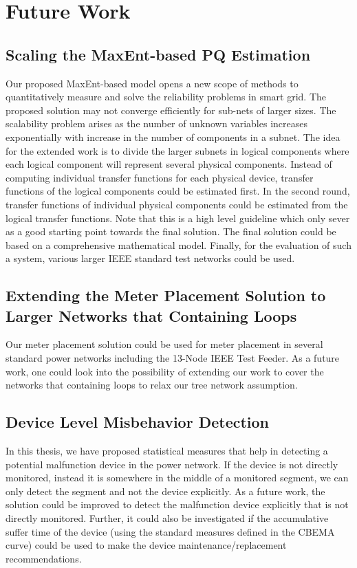 \documentclass[12pt,oneside]{book}
\begin{document}
\section{Future Work}
\subsection{Scaling the MaxEnt-based PQ Estimation}
Our proposed MaxEnt-based model opens a new scope of methods to quantitatively measure and solve the reliability problems in smart grid. The proposed solution may not converge efficiently for sub-nets of larger sizes. The scalability problem arises as the number of unknown variables increases exponentially with increase in the number of components in a subnet. The idea for the extended work is to divide the larger subnets in logical components where each logical component will represent several physical components. Instead of computing individual transfer functions for each physical device, transfer functions of the logical components could be estimated first. In the second round, transfer functions of individual physical components could be estimated from the logical transfer functions. Note that this is a high level guideline which only sever as a good starting point towards the final solution. The final solution could be based on a comprehensive mathematical model. Finally, for the evaluation of such a system, various larger IEEE standard test networks could be used.


\subsection{Extending the Meter Placement Solution to Larger Networks that Containing Loops}
Our meter placement solution could be used for meter placement in several standard power networks including the 13-Node IEEE Test Feeder. As a future work, one could look into the possibility of extending our work to cover the networks that containing loops to relax our tree network assumption.

\subsection{Device Level Misbehavior Detection}
In this thesis, we have proposed statistical measures that help in detecting a potential malfunction device in the power network. If the device is not directly monitored, instead it is somewhere in the middle of a monitored segment, we can only detect the segment and not the device explicitly. As a future work, the solution could be improved to detect the malfunction device explicitly that is not directly monitored. Further, it could also be investigated if the accumulative suffer time of the device (using the standard measures defined in the CBEMA curve) could be used to make the device maintenance/replacement recommendations.
\end{document}
